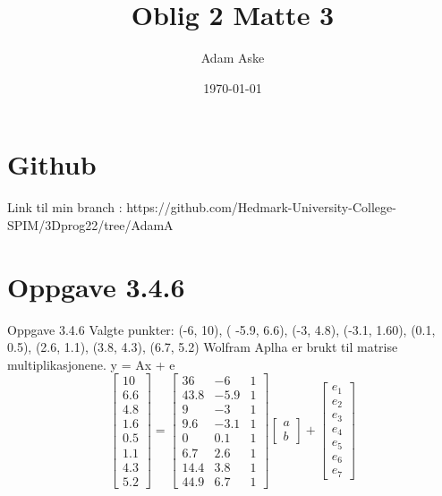 \documentclass[a4paper,norsk]{article}
\title{Oblig 2 Matte 3}
\date{\today}
\author{Adam Aske}
\begin{document}
\maketitle
\tableofcontents
\newpage
 \section{Github}
Link til min branch : https://github.com/Hedmark-University-College-SPIM/3Dprog22/tree/AdamA
\section{Oppgave 3.4.6}
Oppgave 3.4.6
Valgte punkter: (-6, 10), ( -5.9, 6.6), (-3, 4.8), (-3.1, 1.60), (0.1, 0.5), (2.6, 1.1), (3.8, 4.3), (6.7, 5.2)\newline
Wolfram Aplha er brukt til matrise multiplikasjonene. \newline
y = Ax + e \newline
\begin{equation*} 
\begin{bmatrix}10 \\ 6.6\\4.8\\1.6\\0.5\\1.1\\4.3\\5.2\end{bmatrix}
=\begin{bmatrix}36 & -6 & 1 \\ 43.8 & -5.9 & 1 \\9 & -3 & 1 \\ 9.6 & -3.1 & 1 \\0 & 0.1 & 1 \\6.7& 2.6 & 1 \\14.4 & 3.8 & 1 \\ 44.9 & 6.7 & 1\end{bmatrix}\begin{bmatrix}a\\b\end{bmatrix}
+ \begin{bmatrix} e_1 \\ e_2 \\ e_3 \\ e_4 \\ e_5 \\ e_6 \\ e_7\end{bmatrix}
\end{equation*}
\end{document}
